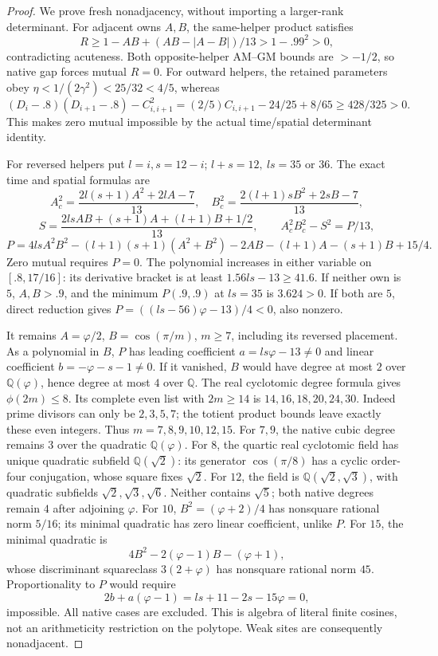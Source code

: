 \documentclass[11pt]{article}
\theoremstyle{definition}
\theoremstyle{remark}
\begin{document}
\begin{proof}
We prove fresh nonadjacency, without importing a
larger-rank determinant. For adjacent owns \(A,B\),
the same-helper product satisfies
\[
 R\geq1-AB+(AB-|A-B|)/13>1-.99^2>0,
\]
contradicting acuteness. Both opposite-helper
AM--GM bounds are \(>-1/2\), so native gap forces
mutual \(R=0\).
For outward helpers, the retained parameters obey
\(\eta<1/(2\gamma^2)<25/32<4/5\), whereas
\[
 (D_i-.8)(D_{i+1}-.8)-C_{i,i+1}^2
 =(2/5)C_{i,i+1}-24/25+8/65
 \geq428/325>0.
\]
This makes zero mutual impossible by the actual
time/spatial determinant identity.

For reversed helpers put \(l=i,s=12-i\);
\(l+s=12,\ ls=35\) or \(36\).
The exact time and spatial formulas are
\[
 A_c^2=\frac{2l(s+1)A^2+2lA-7}{13},\quad
 B_c^2=\frac{2(l+1)sB^2+2sB-7}{13},
\]
\[
 S=\frac{2lsAB+(s+1)A+(l+1)B+1/2}{13},\qquad
 A_c^2B_c^2-S^2=P/13,
\]
\[
 P=4lsA^2B^2-(l+1)(s+1)(A^2+B^2)-2AB
 -(l+1)A-(s+1)B+15/4.
\]
Zero mutual requires \(P=0\).
The polynomial increases in either variable on
\([.8,17/16]\): its derivative bracket is at
least \(1.56ls-13\geq41.6\).
If neither own is \(5\), \(A,B>.9\), and the
minimum \(P(.9,.9)\) at \(ls=35\) is \(3.624>0\).
If both are \(5\), direct reduction gives
\(P=((ls-56)\varphi-13)/4<0\), also nonzero.

It remains \(A=\varphi/2\), \(B=\cos(\pi/m)\),
\(m\geq7\), including its reversed placement.
As a polynomial in \(B\), \(P\) has leading
coefficient \(a=ls\varphi-13\ne0\) and linear
coefficient \(b=-\varphi-s-1\ne0\).
If it vanished, \(B\) would have degree at most
\(2\) over \(\mathbb Q(\varphi)\), hence degree
at most \(4\) over \(\mathbb Q\).
The real cyclotomic degree formula gives
\(\phi(2m)\leq8\).
Its complete even list with \(2m\geq14\) is
\(14,16,18,20,24,30\).
Indeed prime divisors can only be \(2,3,5,7\);
the totient product bounds leave exactly these
even integers. Thus
\(m=7,8,9,10,12,15\).
For \(7,9\), the native cubic degree remains
\(3\) over the quadratic \(\mathbb Q(\varphi)\).
For \(8\), the quartic real cyclotomic field
has unique quadratic subfield \(\mathbb Q(\sqrt2)\):
its generator \(\cos(\pi/8)\) has a cyclic
order-four conjugation, whose square fixes
\(\sqrt2\).
For \(12\), the field is
\(\mathbb Q(\sqrt2,\sqrt3)\), with quadratic
subfields \(\sqrt2,\sqrt3,\sqrt6\).
Neither contains \(\sqrt5\); both native
degrees remain \(4\) after adjoining \(\varphi\).
For \(10\), \(B^2=(\varphi+2)/4\) has
nonsquare rational norm \(5/16\); its minimal
quadratic has zero linear coefficient, unlike \(P\).
For \(15\), the minimal quadratic is
\[
 4B^2-2(\varphi-1)B-(\varphi+1),
\]
whose discriminant squareclass \(3(2+\varphi)\)
has nonsquare rational norm \(45\).
Proportionality to \(P\) would require
\[
 2b+a(\varphi-1)=ls+11-2s-15\varphi=0,
\]
impossible. All native cases are excluded.
This is algebra of literal finite cosines,
not an arithmeticity restriction on the polytope.
Weak sites are consequently nonadjacent.


\end{proof}
\end{document}
